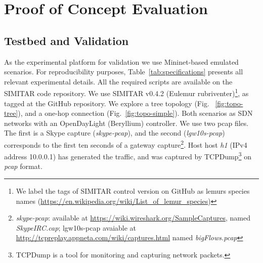 \chapter{Proof of Concept Evaluation}\label{ch:validation}


\section{Testbed and Validation}


As the experimental platform for validation we use Mininet-based emulated scenarios.  For reproducibility purposes, Table~\ref{tab:specifications} presents all relevant experimental details. All the required scripts are available on the SIMITAR code repository\cite{projeto-github}. We use SIMITAR v0.4.2 (Eulemur rubriventer)\footnote{ We label the tags of SIMITAR control version on GitHub as lemurs species names (\href{https://en.wikipedia.org/wiki/List_of_lemur_species}{https://en.wikipedia.org/wiki/List\_of\_lemur\_species})}, as tagged at the GitHub repository. We explore a tree topology (Fig. ~\ref{fig:topo-tree}), and a one-hop connection (Fig.~\ref{fig:topo-simple}). Both scenarios as  SDN networks with an OpenDayLight (Beryllium) controller. We use two pcap files. The first is a Skype capture (\textit{skype-pcap}), and the second (\textit{lgw10s-pcap}) corresponds to the first ten seconds of a gateway capture\footnote{\textit{skype-pcap}: available at \url{https://wiki.wireshark.org/SampleCaptures}, named \textit{SkypeIRC.cap}; lgw10s-pcap avaiable at \url{http://tcpreplay.appneta.com/wiki/captures.html} named \textit{bigFlows.pcap}}. Host host \textit{h1} (IPv4 address 10.0.0.1) has generated the traffic, and was captured by TCPDump\footnote{TCPDump is a tool for monitoring and capturing network packets\cite{web-tcpdump}.} on \textit{pcap} format. 

